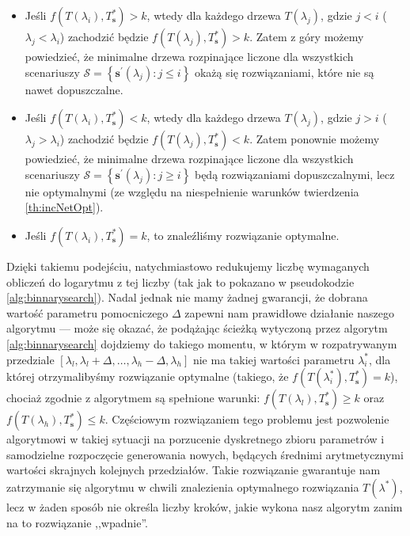 {\begin{itemize}
	\item Jeśli $f \left( T \left( \lambda_{i} \right), T^{\ast}_{\textbf{s}} \right) > k$, wtedy dla każdego drzewa $T \left( \lambda_{j} \right)$, gdzie $j < i$ ($\lambda_{j} < \lambda_{i}$) zachodzić będzie $f \left( T \left( \lambda_{j} \right), T^{\ast}_{\textbf{s}} \right) > k$. Zatem z góry możemy powiedzieć, że minimalne drzewa rozpinające liczone dla wszystkich scenariuszy $\mathcal{S} = \left\{ \textbf{s}^{\prime} \left( \lambda_{j} \right) : j \leqslant i \right\}$ okażą się rozwiązaniami, które nie są nawet dopuszczalne.
	\item Jeśli $f \left( T \left( \lambda_{i} \right), T^{\ast}_{\textbf{s}} \right) < k$, wtedy dla każdego drzewa $T \left( \lambda_{j} \right)$, gdzie $j > i$ ($\lambda_{j} > \lambda_{i}$) zachodzić będzie $f \left( T \left( \lambda_{j} \right), T^{\ast}_{\textbf{s}} \right) < k$. Zatem ponownie możemy powiedzieć, że minimalne drzewa rozpinające liczone dla wszystkich scenariuszy $\mathcal{S} = \left\{ \textbf{s}^{\prime} \left( \lambda_{j} \right) : j \geqslant i \right\}$ będą rozwiązaniami dopuszczalnymi, lecz nie optymalnymi (ze względu na niespełnienie warunków twierdzenia \ref{th:incNetOpt}).
	\item Jeśli $f \left( T \left( \lambda_{i} \right), T^{\ast}_{\textbf{s}} \right) = k$, to znaleźliśmy rozwiązanie optymalne.
\end{itemize}

Dzięki takiemu podejściu, natychmiastowo redukujemy liczbę wymaganych obliczeń do logarytmu z tej liczby (tak jak to pokazano w pseudokodzie \ref{alg:binnarysearch}). Nadal jednak nie mamy żadnej gwarancji, że dobrana wartość parametru pomocniczego $\Delta$ zapewni nam prawidłowe działanie naszego algorytmu --- może się okazać, że podążając ścieżką wytyczoną przez algorytm \ref{alg:binnarysearch} dojdziemy do takiego momentu, w którym w rozpatrywanym przedziale $\left[ \lambda_{l}, \lambda_{l} + \Delta, \dots, \lambda_{h} - \Delta, \lambda_{h} \right]$ nie ma takiej wartości parametru $\lambda^{\ast}_{i}$, dla której otrzymalibyśmy rozwiązanie optymalne (takiego, że $f \left( T \left( \lambda^{\ast}_{i} \right), T^{\ast}_{\textbf{s}} \right) = k$), chociaż zgodnie z algorytmem są spełnione warunki: $f \left( T \left( \lambda_{l} \right), T^{\ast}_{\textbf{s}} \right) \geqslant k$ oraz $f \left( T \left( \lambda_{h} \right), T^{\ast}_{\textbf{s}} \right) \leqslant k$. Częściowym rozwiązaniem tego problemu jest pozwolenie algorytmowi w takiej sytuacji na porzucenie dyskretnego zbioru parametrów i samodzielne rozpoczęcie generowania nowych, będących średnimi arytmetycznymi wartości skrajnych kolejnych przedziałów. Takie rozwiązanie gwarantuje nam zatrzymanie się algorytmu w chwili znalezienia optymalnego rozwiązania $T \left( \lambda^{\ast} \right)$, lecz w żaden sposób nie określa liczby kroków, jakie wykona nasz algorytm zanim na to rozwiązanie ,,wpadnie''.

}
